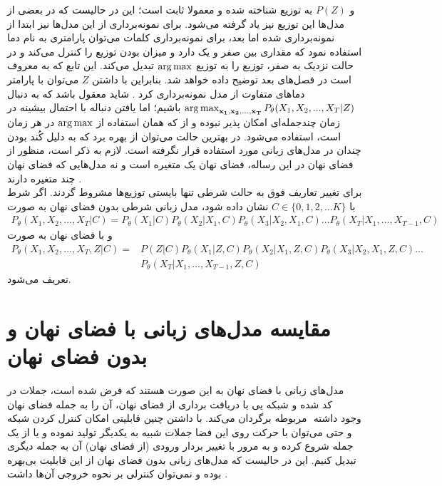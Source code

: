 و $P(Z)$ به توزیع
شناخته شده و معمولا ثابت است؛ این در حالیست که در بعضی از مدل‌ها این توزیع نیز یاد گرفته می‌شود. برای نمونه‌برداری از این مدل‌ها نیز ابتدا از \priordist{} نمونه‌برداری شده اما بعد، برای نمونه‌برداری کلمات می‌توان پارامتری به نام دما استفاده نمود که مقداری بین صفر و یک دارد و میزان 
بودن توزیع را کنترل می‌کند و در حالت نزدیک به صفر، توزیع را به توزیع $\operatorname*{arg\,max}$ تبدیل می‌کند. این تابع که به  معروف است در فصل‌های بعد توضیح داده خواهد شد. بنابراین با داشتن $Z$ می‌توان با پارامتر دما‌های متفاوت از مدل نمونه‌برداری کرد \cite{toward}. شاید معقول باشد که به دنبال
$\operatorname*{arg\,max}_{{\bf x_1}, {\bf x_2}, ..., {\bf x_T}} P_\theta(X_1, X_2, ... , X_T|Z)$
باشیم؛ اما یافتن دنباله با احتمال بیشینه در زمان چندجمله‌ای امکان پذیر نبوده و از \greedydecoding{} که همان استفاده از $\operatorname*{arg\,max}$ در هر زمان است، استفاده می‌شود. در بهترین حالت می‌توان از
بهره برد که به دلیل کُند بودن چندان در مدل‌های زبانی مورد استفاده قرار نگرفته است. لازم به ذکر است، منظور از فضای نهان در این رساله، فضای نهان یک متغیره است و نه مدل‌هایی که فضای نهان چند متغیره دارند \cite{vae_multilevel}.
\\
برای تغییر تعاریف فوق به حالت شرطی تنها بایستی توزیع‌ها مشروط گردند. اگر شرط با $C \in \{0,1,2,...K\}$ نشان داده شود، مدل زبانی شرطی بدون فضای نهان به صورت
\begin{align}
	P_\theta(X_1, X_2, ... , X_T|C) = P_\theta(X_1|C) P_\theta(X_2|X_1,C) P_\theta(X_3|X_2, X_1,C) ... P_\theta(X_T|X_1, ..., X_{T-1},C)
\end{align}
و با فضای نهان به صورت
\begin{align}
	P_\theta(X_1, X_2, ... , X_T,Z|C) = & P(Z|C) P_\theta(X_1|Z,C) P_\theta(X_2|X_1,Z,C) P_\theta(X_3|X_2, X_1,Z,C) ... \nonumber \\& P_\theta(X_T|X_1, ..., X_{T-1},Z,C)
\end{align}
تعریف می‌شود.
\section{مقایسه مدل‌های زبانی با فضای نهان و بدون فضای نهان} \label{chap1:latent_or_not}
مدل‌های زبانی با فضای نهان به این صورت هستند که فرض شده است، جملات در فضای نهان ‎کد شده و شبکه 
یی 
با دریافت برداری از فضای نهان، آن را به جمله مربوطه برگردان می‌کند. با داشتن چنین قابلیتی امکان کنترل کردن شبکه ‎\decoder{}‎ وجود داشته و حتی می‌توان با حرکت روی این فضا جملات شبیه به یکدیگر تولید نموده و یا از یک جمله شروع کرده و به مرور با تغییر بردار ورودی (از فضای نهان) آن به جمله دیگری تبدیل کنیم. این در حالیست که مدل‌های زبانی بدون فضای نهان از این قابلیت بی‌بهره بوده و نمی‌توان کنترلی بر نحوه خروجی آن‌ها داشت \cite{vae_text}.
